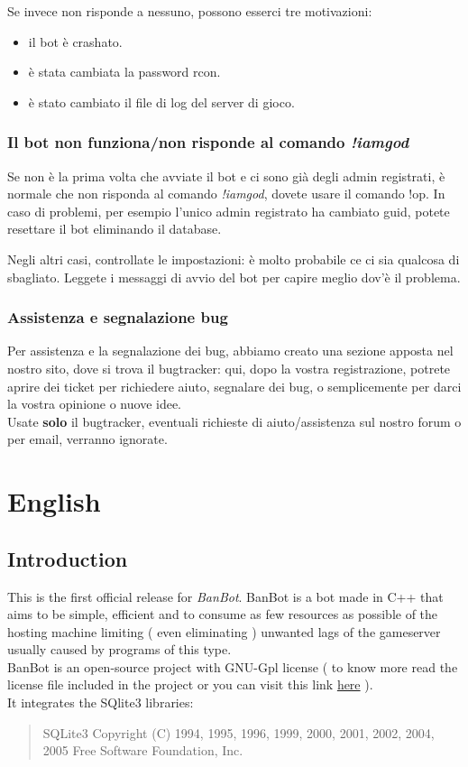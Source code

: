 \documentclass[a4paper]{article}
\begin{document}
Se invece non risponde a nessuno, possono esserci tre motivazioni:
\begin{itemize}
\item il bot \`e crashato.
\item \`e stata cambiata la password rcon.
\item \`e stato cambiato il file di log del server di gioco.
\end{itemize}

\subsubsection{Il bot non funziona/non risponde al comando \textit{!iamgod}}
Se non \`e la prima volta che avviate il bot e ci sono gi\`a degli admin registrati, \`e normale che non risponda al comando \textit{!iamgod}, dovete  usare il comando !op. In caso di problemi, per esempio l'unico admin registrato ha cambiato guid, potete resettare il bot eliminando il database.

Negli altri casi, controllate le  impostazioni: \`e molto probabile ce ci sia qualcosa di sbagliato. Leggete i messaggi di avvio del bot per capire meglio dov'\`e il problema.

\subsubsection{Assistenza e segnalazione bug}
\label{ita:assistenza}
Per assistenza e la segnalazione dei bug, abbiamo creato una sezione apposta nel nostro sito, dove si trova il bugtracker: qui, dopo la vostra registrazione, potrete aprire dei ticket per richiedere aiuto, segnalare dei bug, o semplicemente per darci la vostra opinione o nuove idee.\\
Usate \textbf{solo} il bugtracker, eventuali richieste di aiuto/assistenza sul nostro forum o per email, verranno ignorate.




\newpage
\section {English}


\subsection {Introduction}
This is the first official release for \textit{BanBot}.
BanBot is a bot made in C++ that aims to be simple, efficient and to consume as few resources as possible of the hosting machine limiting ( even eliminating ) unwanted
lags of the gameserver usually caused by programs of this type.\\
BanBot is an open-source project with GNU-Gpl license ( to know more read the license file included in the project or you can visit this link \href{http://www.gnu.org/licenses/}{here} ).\\
It integrates the SQlite3 libraries:
\begin{quote}
 SQLite3 Copyright (C) 1994, 1995, 1996, 1999, 2000, 2001, 2002, 2004, 2005 Free Software Foundation, Inc.
\end{quote}
\end{document}
